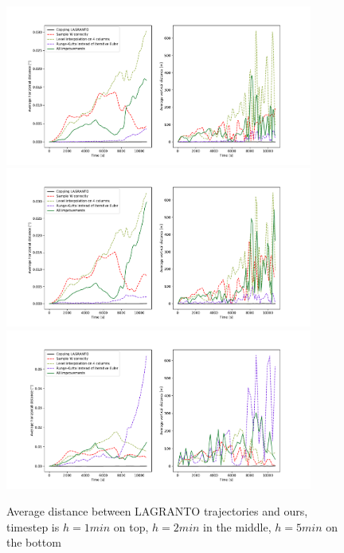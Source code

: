 \begin{figure}
\centering \includegraphics*[width=0.9\textwidth]{figures/plot_dt1}
\label{fig:plot_dt1}
\centering \includegraphics*[width=0.9\textwidth]{figures/plot_dt2}
\label{fig:plot_dt2}
\centering \includegraphics*[width=0.9\textwidth]{figures/plot_dt5}
\caption{Average distance between LAGRANTO trajectories and ours, timestep is $h = 1 min$ on top, $h = 2 min$ in the middle, $h = 5 min$ on the bottom}
\label{fig:plot_dt5}
\end{figure}

